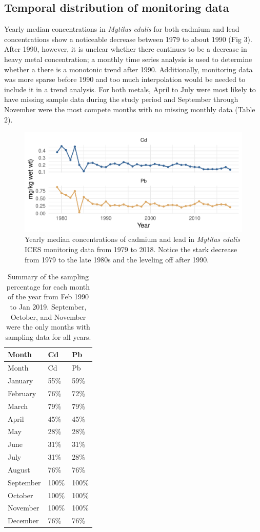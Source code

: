 \documentclass[
  12pt,
]{article}
\begin{document}
\hypertarget{temporal-distribution-of-monitoring-data}{%
\subsection{Temporal distribution of monitoring
data}\label{temporal-distribution-of-monitoring-data}}

Yearly median concentrations in \emph{Mytilus edulis} for both cadmium
and lead concentrations show a noticeable decrease between 1979 to about
1990 (Fig 3). After 1990, however, it is unclear whether there continues
to be a decrease in heavy metal concentration; a monthly time series
analysis is used to determine whether a there is a monotonic trend after
1990. Additionally, monitoring data was more sparse before 1990 and too
much interpolation would be needed to include it in a trend analysis.
For both metals, April to July were most likely to have missing sample
data during the study period and September through November were the
most compete months with no missing monthly data (Table 2).

\begin{figure}
\centering
\includegraphics{McCrory_ENV972_Project_files/figure-latex/unnamed-chunk-3-1.pdf}
\caption{Yearly median concentrations of cadmium and lead in
\emph{Mytilus edulis} ICES monitoring data from 1979 to 2018. Notice the
stark decrease from 1979 to the late 1980s and the leveling off after
1990.}
\end{figure}

\begin{longtable}[]{@{}lll@{}}
\caption{Summary of the sampling percentage for each month of the year
from Feb 1990 to Jan 2019. September, October, and November were the
only months with sampling data for all years.}\tabularnewline
\toprule
Month & Cd & Pb\tabularnewline
\midrule
\endfirsthead
\toprule
Month & Cd & Pb\tabularnewline
\midrule
\endhead
January & 55\% & 59\%\tabularnewline
February & 76\% & 72\%\tabularnewline
March & 79\% & 79\%\tabularnewline
April & 45\% & 45\%\tabularnewline
May & 28\% & 28\%\tabularnewline
June & 31\% & 31\%\tabularnewline
July & 31\% & 28\%\tabularnewline
August & 76\% & 76\%\tabularnewline
September & 100\% & 100\%\tabularnewline
October & 100\% & 100\%\tabularnewline
November & 100\% & 100\%\tabularnewline
December & 76\% & 76\%\tabularnewline
\bottomrule
\end{longtable}
\end{document}
